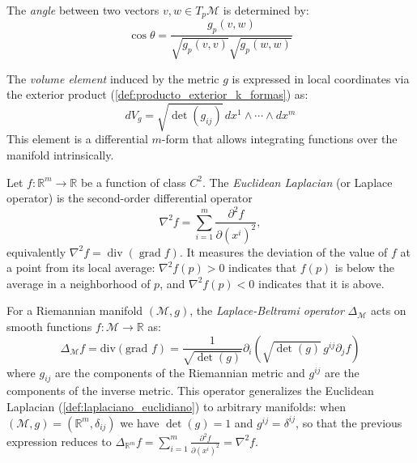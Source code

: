\begin{definition}\label{def:angulos_variedades}
The \textit{angle} between two vectors $v, w \in T_p\mathcal{M}$ is determined by:
\[
\cos\theta = \frac{g_p(v,w)}{\sqrt{g_p(v,v)}\sqrt{g_p(w,w)}}
\]
\end{definition}

\begin{definition}\label{def:elemento_volumen}
The \textit{volume element} induced by the metric $g$ is expressed in local coordinates via the exterior product (\autoref{def:producto_exterior_k_formas}) as:
\[
dV_g = \sqrt{\det(g_{ij})} \, dx^1 \wedge \cdots \wedge dx^m
\]
This element is a differential $m$-form that allows integrating functions over the manifold intrinsically.
\end{definition}

\begin{definition}\label{def:laplaciano_euclidiano}
Let $f: \mathbb{R}^m \to \mathbb{R}$ be a function of class $C^2$. The \textit{Euclidean Laplacian} (or Laplace operator) is the second-order differential operator
\[
\nabla^2 f = \sum_{i=1}^{m} \frac{\partial^2 f}{\partial (x^i)^2},
\]
equivalently $\nabla^2 f = \operatorname{div}(\operatorname{grad} f)$. It measures the deviation of the value of $f$ at a point from its local average: $\nabla^2 f(p) > 0$ indicates that $f(p)$ is below the average in a neighborhood of $p$, and $\nabla^2 f(p) < 0$ indicates that it is above.
\end{definition}

\begin{definition}\label{def:laplace_beltrami}
For a Riemannian manifold $(\mathcal{M}, g)$, the \textit{Laplace-Beltrami operator} $\Delta_\mathcal{M}$ acts on smooth functions $f: \mathcal{M} \to \mathbb{R}$ as:
\[
\Delta_\mathcal{M} f = \text{div}(\text{grad } f) = \frac{1}{\sqrt{\det(g)}} \partial_i\left(\sqrt{\det(g)} \, g^{ij} \partial_j f\right)
\]
where $g_{ij}$ are the components of the Riemannian metric and $g^{ij}$ are the components of the inverse metric. This operator generalizes the Euclidean Laplacian (\autoref{def:laplaciano_euclidiano}) to arbitrary manifolds: when $(\mathcal{M}, g) = (\mathbb{R}^m, \delta_{ij})$ we have $\det(g) = 1$ and $g^{ij} = \delta^{ij}$, so that the previous expression reduces to $\Delta_{\mathbb{R}^m} f = \sum_{i=1}^{m} \frac{\partial^2 f}{\partial (x^i)^2} = \nabla^2 f$.
\end{definition}

